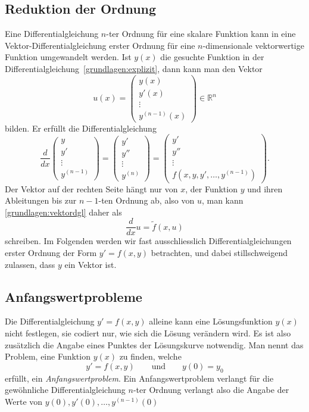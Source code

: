 \subsection{Reduktion der Ordnung}
%
%
Eine Differentialgleichung $n$-ter Ordnung für eine skalare Funktion
kann in eine Vektor-Differen\-tialgleichung erster Ordnung für eine
%
%
$n$-dimensionale vektorwertige Funktion umgewandelt werden.
Ist $y(x)$ die gesuchte Funktion in der
Differentialgleichung~\eqref{grundlagen:explizit}, dann kann man
den Vektor
\[
u(x)=\begin{pmatrix}
y(x)\\y'(x)\\\vdots\\y^{(n-1)}(x)
\end{pmatrix}
\in\mathbb R^n
\]
bilden.
Er erfüllt die Differentialgleichung
\begin{equation}
\frac{d}{dx}\begin{pmatrix}
y\\y'\\\vdots\\y^{(n-1)}
\end{pmatrix}
=
\begin{pmatrix}
y'\\y''\\\vdots\\y^{(n)}
\end{pmatrix}
=
\begin{pmatrix}
y'\\y''\\\vdots\\f(x,y,y',\dots,y^{(n-1)})
\end{pmatrix}.
\label{grundlagen:vektordgl}
\end{equation}
Der Vektor auf der rechten Seite hängt nur von $x$, der Funktion $y$
und ihren Ableitungen bis zur $n-1$-ten Ordnung ab, also von $u$, man
kann \eqref{grundlagen:vektordgl} daher als
\begin{equation}
\frac{d}{dx}u=\tilde{f}(x,u)
\end{equation}
schreiben.
Im Folgenden werden wir fast ausschliesslich Differentialgleichungen
erster Ordnung der Form $y'=f(x,y)$ betrachten, und dabei stillschweigend
zulassen, dass $y$ ein Vektor ist.

\subsection{Anfangswertprobleme\label{section:anfangswertprobleme}}
%
Die Differentialgleichung $y'=f(x,y)$ alleine kann eine Lösungsfunktion
$y(x)$ nicht festlegen, sie codiert nur, wie sich die Lösung verändern wird.
Es ist also zusätzlich die Angabe eines Punktes der Lösungskurve
notwendig.
Man nennt das Problem, eine Funktion $y(x)$ zu finden, welche
\[
y'=f(x,y)
\qquad
\text{und}
\qquad
y(0)=y_0
\]
erfüllt, ein {\em Anfangswertproblem}.
Ein Anfangswertproblem verlangt für die gewöhnliche Differentialgleichung
$n$-ter Ordnung verlangt also die Angabe der Werte von
$y(0),y'(0),\dots,y^{(n-1)}(0)$

